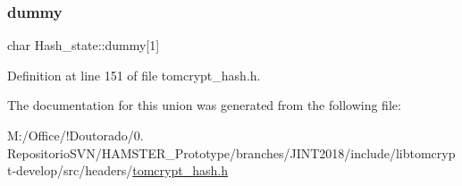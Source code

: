 \subsubsection{\texorpdfstring{dummy}{dummy}}
{\footnotesize\ttfamily char Hash\+\_\+state\+::dummy\mbox{[}1\mbox{]}}



Definition at line 151 of file tomcrypt\+\_\+hash.\+h.



The documentation for this union was generated from the following file\+:\begin{DoxyCompactItemize}
\item 
M\+:/\+Office/!\+Doutorado/0. Repositorio\+S\+V\+N/\+H\+A\+M\+S\+T\+E\+R\+\_\+\+Prototype/branches/\+J\+I\+N\+T2018/include/libtomcrypt-\/develop/src/headers/\mbox{\hyperlink{tomcrypt__hash_8h}{tomcrypt\+\_\+hash.\+h}}\end{DoxyCompactItemize}
